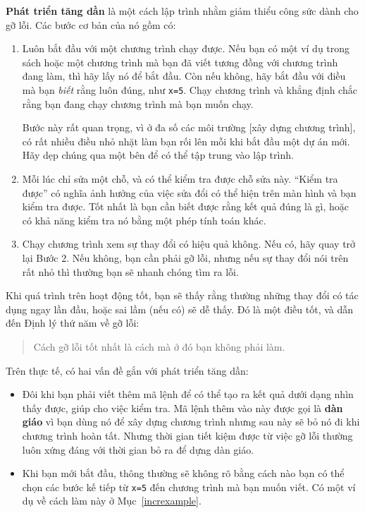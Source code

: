 \documentclass[12pt]{book}
\begin{document}
{\bf Phát triển tăng dần} là một cách lập trình nhằm giảm thiểu
công sức dành cho gỡ lỗi. Các bước cơ bản của nó gồm có:

\begin{enumerate}

\item Luôn bắt đầu với một chương trình chạy được. Nếu bạn 
có một ví dụ trong sách hoặc một chương trình mà bạn đã viết
tương đồng với chương trình đang làm, thì hãy lấy nó để bắt
đầu. Còn nếu không, hãy bắt đầu với điều mà bạn {\em biết}
rằng luôn đúng, như {\tt x=5}.  Chạy chương trình và khẳng định
chắc rằng bạn đang chạy chương trình mà bạn muốn chạy.

Bước này rất quan trọng, vì ở đa số các môi trường [xây dựng 
chương trình], có rất nhiều điều nhỏ nhặt làm bạn rối lên mỗi
khi bắt đầu một dự án mới. Hãy dẹp chúng qua một bên để
có thể tập trung vào lập trình.

\item Mỗi lúc chỉ sửa một chỗ, và có thể kiểm tra được chỗ sửa này.
``Kiểm tra được'' có nghĩa ảnh hưởng của việc sửa đổi có thể 
hiện trên màn hình và bạn kiểm tra được. Tốt nhất là bạn cần
biết được rằng kết quả đúng là gì, hoặc có khả năng kiểm tra nó
bằng một phép tính toán khác.

\item Chạy chương trình xem sự thay đổi có hiệu quả không. Nếu
có, hãy quay trở lại Bước 2. Nếu không, bạn cần phải gỡ lỗi, nhưng
nếu sự thay đổi nói trên rất nhỏ thì thường bạn sẽ nhanh chóng
tìm ra lỗi.

\end{enumerate}

Khi quá trình trên hoạt động tốt, bạn sẽ thấy rằng thường những
thay đổi có tác dụng ngay lần đầu, hoặc sai lầm (nếu có) sẽ dễ 
thấy. Đó là một điều tốt, và dẫn đến Định lý thứ năm về gỡ lỗi:

\begin{quote}
Cách gỡ lỗi tốt nhất là cách mà ở đó bạn không phải làm.
\end{quote}

Trên thực tế, có hai vấn đề gắn với phát triển tăng dần:

\begin{itemize}

\item Đôi khi bạn phải viết thêm mã lệnh để có thể tạo ra kết quả
dưới dạng nhìn thấy được, giúp cho việc kiểm tra. Mã lệnh thêm vào
này được gọi là {\bf dàn giáo} vì bạn dùng nó để xây dựng chương trình
nhưng sau này sẽ bỏ nó đi khi chương trình hoàn tất. Nhưng thời gian
tiết kiệm được từ việc gỡ lỗi thường luôn xứng đáng với thời gian
bỏ ra để dựng dàn giáo.

\item Khi bạn mới bắt đầu, thông thường sẽ không rõ bằng cách nào
bạn có thể chọn các bước kế tiếp từ {\tt x=5} đến chương trình mà
bạn muốn viết. Có một ví dụ về cách làm này ở Mục~\ref{increxample}.

\end{itemize}
\end{document}
